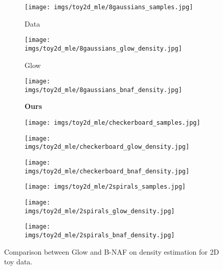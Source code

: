 \documentclass[letterpaper]{article}
\newcommand{\fw}{0.23\linewidth}
\begin{document}
\begin{figure}[t]
 \centering
 \begin{subfigure}[b]{\fw}
 \centering
 \caption*{Data}
 \vspace{-2mm}
 \texttt{[image: imgs/toy2d\_mle/8gaussians\_samples.jpg]}
 \end{subfigure}\hspace{1mm}\begin{subfigure}[b]{\fw}
 \centering
 \caption*{Glow}
 \vspace{-2mm}
 \texttt{[image: imgs/toy2d\_mle/8gaussians\_glow\_density.jpg]}
 \end{subfigure}\hspace{1mm}\begin{subfigure}[b]{\fw}
 \centering
 \caption*{\textbf{Ours}}
 \vspace{-2mm}
 \texttt{[image: imgs/toy2d\_mle/8gaussians\_bnaf\_density.jpg]}
 \end{subfigure}

 \vspace{1em}
 \begin{subfigure}[b]{\fw}
 \centering
 \vspace{-2mm}
 \texttt{[image: imgs/toy2d\_mle/checkerboard\_samples.jpg]}
 \end{subfigure}\hspace{1mm}\begin{subfigure}[b]{\fw}
 \centering
 \vspace{-2mm}
 \texttt{[image: imgs/toy2d\_mle/checkerboard\_glow\_density.jpg]}
 \end{subfigure}\hspace{1mm}\begin{subfigure}[b]{\fw}
 \centering
 \vspace{-2mm}
 \texttt{[image: imgs/toy2d\_mle/checkerboard\_bnaf\_density.jpg]}
 \end{subfigure}

 \vspace{1em}
 \begin{subfigure}[b]{\fw}
 \centering
 \vspace{-2mm}
 \texttt{[image: imgs/toy2d\_mle/2spirals\_samples.jpg]}
 \end{subfigure}\hspace{1mm}\begin{subfigure}[b]{\fw}
 \centering
 \vspace{-2mm}
 \texttt{[image: imgs/toy2d\_mle/2spirals\_glow\_density.jpg]}
 \end{subfigure}\hspace{1mm}\begin{subfigure}[b]{\fw}
 \centering
 \vspace{-2mm}
 \texttt{[image: imgs/toy2d\_mle/2spirals\_bnaf\_density.jpg]}
 \end{subfigure}\caption{Comparison between Glow and B-NAF on density estimation for 2D toy data.}
 \label{fig:toy2d_mle}
\end{figure}
\end{document}
